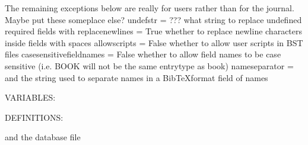 \documentclass[letterpaper,10pt,english]{sphinxmanual}
\begin{document}
\begin{sphinxVerbatim}[commandchars=\\\{\}]
\PYGZsh{}\PYGZsh{} The remaining exceptions below are really for users rather than for the journal. Maybe put these someplace else?
undefstr = ???                            \PYGZsh{}\PYGZsh{} what string to replace undefined required fields with
replace\PYGZus{}newlines = True                   \PYGZsh{}\PYGZsh{} whether to replace newline characters inside fields with spaces
allow\PYGZus{}scripts = False                     \PYGZsh{}\PYGZsh{} whether to allow user scripts in BST files
case\PYGZus{}sensitive\PYGZus{}field\PYGZus{}names = False        \PYGZsh{}\PYGZsh{} whether to allow field names to be case sensitive (i.e. \PYGZdq{}BOOK\PYGZdq{} will not be the same entrytype as \PYGZdq{}book\PYGZdq{})
name\PYGZus{}separator = and                      \PYGZsh{}\PYGZsh{} the string used to separate names in a BibTeX\PYGZhy{}format field of names

VARIABLES:

DEFINITIONS:
\end{sphinxVerbatim}

and the database file
\end{document}
